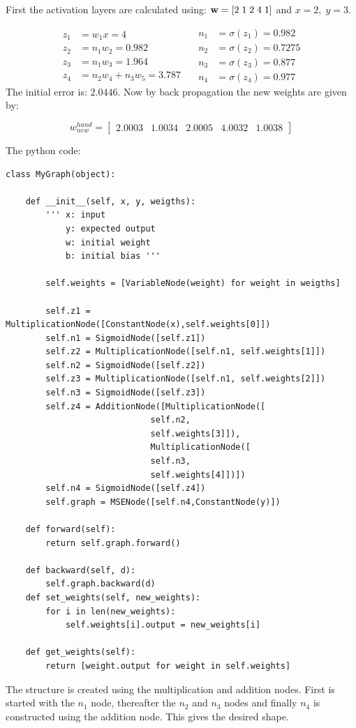 \documentclass[a4paper,12pt]{article}
\begin{document}
First the activation layers are calculated using: ${\bf w}=[2 \; 1 \; 2 \; 4 \; 1]$ and $x=2,\;y=3$.

\begin{equation}
\begin{aligned}
z_1 &= w_1x = 4 \\
z_2 &= n_1w_2 = 0.982  \\
z_3 &= n_1w_3 = 1.964 \\
z_4 &= n_2w_4+n_3w_5=3.787
\end{aligned}
\quad
\begin{aligned}
n_1 &= \sigma(z_1)=0.982  \\
n_2 &= \sigma(z_2)=0.7275 \\
n_3 &=  \sigma(z_3)=0.877 \\
n_4 &=\sigma(z_4)=0.977 
\end{aligned}
\end{equation}
The initial error is: $2.0446$.  
Now by back propagation the new weights are given by:

\begin{equation}
w_{new}^{hand}=\begin{bmatrix} 2.0003 &    1.0034  &   2.0005  &   4.0032  &   1.0038
\end{bmatrix}
\label{eq:handmade}
\end{equation}

The python code:

\begin{lstlisting}
class MyGraph(object):

    def __init__(self, x, y, weigths):
        ''' x: input
            y: expected output
            w: initial weight
            b: initial bias '''
                       
        self.weights = [VariableNode(weight) for weight in weigths]

        self.z1 = MultiplicationNode([ConstantNode(x),self.weights[0]])
        self.n1 = SigmoidNode([self.z1])
        self.z2 = MultiplicationNode([self.n1, self.weights[1]])
        self.n2 = SigmoidNode([self.z2])
        self.z3 = MultiplicationNode([self.n1, self.weights[2]])
        self.n3 = SigmoidNode([self.z3])
        self.z4 = AdditionNode([MultiplicationNode([
                             self.n2,
                             self.weights[3]]),
                             MultiplicationNode([
                             self.n3,
                             self.weights[4]])])
        self.n4 = SigmoidNode([self.z4])
        self.graph = MSENode([self.n4,ConstantNode(y)])

    def forward(self):
        return self.graph.forward()

    def backward(self, d):
        self.graph.backward(d)
    def set_weights(self, new_weights):
        for i in len(new_weights):
            self.weights[i].output = new_weights[i]

    def get_weights(self):
        return [weight.output for weight in self.weights]
\end{lstlisting}
The structure is created using the multiplication and addition nodes. First is started with the $n_1$ node, thereafter the $n_2$ and $n_3$ nodes and finally $n_4$ is constructed using the addition node. This gives the desired shape.
\end{document}
